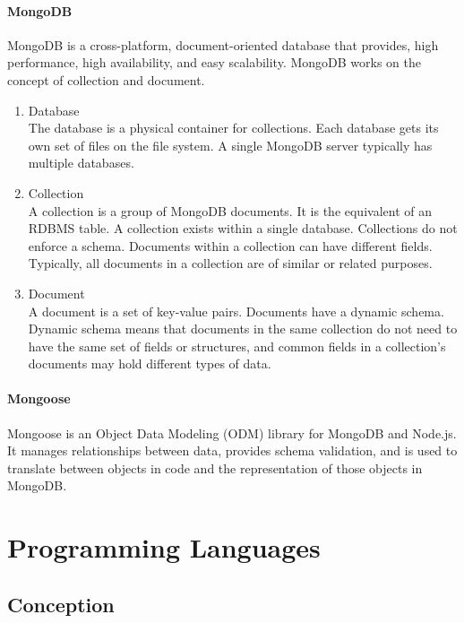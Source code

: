 \paragraph{MongoDB}
MongoDB is a cross-platform, document-oriented database that provides, high performance, high availability, and easy scalability. MongoDB works on the concept of collection and document.
\begin{enumerate}
      \item
            Database\\
            The database is a physical container for collections. Each database gets its own set of files on the file system. A single MongoDB server typically has multiple databases.
      \item
            Collection\\
            A collection is a group of MongoDB documents. It is the equivalent of an RDBMS table. A collection exists within a single database. Collections do not enforce a schema. Documents within a collection can have different fields. Typically, all documents in a collection are of similar or related purposes.
      \item
            Document\\
            A document is a set of key-value pairs. Documents have a dynamic schema. Dynamic schema means that documents in the same collection do not need to have the same set of fields or structures, and common fields in a collection's documents may hold different types of data.
\end{enumerate}


\paragraph{Mongoose}
Mongoose is an Object Data Modeling (ODM) library for MongoDB and Node.js. It manages relationships between data, provides schema validation, and is used to translate between objects in code and the representation of those objects in MongoDB.










\section{Programming Languages}

\subsection{Conception}
